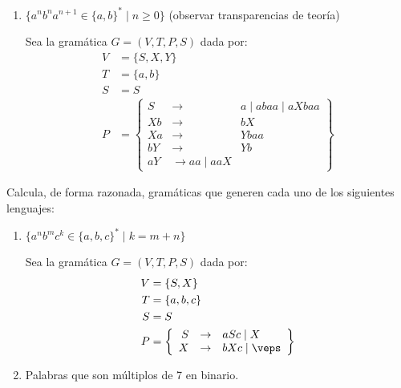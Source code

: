 \begin{ejercicio}
\begin{enumerate}
        \item $\{a^nb^na^{n+1} \in \{a,b\}^\ast \mid n\geq 0\}$ (observar transparencias de teoría)
        
        Sea la gramática $G=\left(V,T,P,S\right)$ dada por:
        \begin{align*}
            V &= \{S, X, Y\} \\
            T &= \{a,b\} \\
            S &= S \\
            P &= \left\{
                \begin{array}{rcl}
                    S &\rightarrow & a\mid abaa\mid aXbaa\\
                    Xb & \rightarrow & bX\\
                    Xa & \rightarrow & Ybaa\\
                    bY & \rightarrow & Yb\\
                    aY & \rightarrow aa\mid aaX
                \end{array}
            \right\}
        \end{align*}
    \end{enumerate}
\end{ejercicio}


\begin{ejercicio}
    Calcula, de forma razonada, gramáticas que generen cada uno de los siguientes lenguajes:
    \begin{enumerate}
        \item $\{a^nb^mc^k \in \{a,b,c\}^\ast \mid k = m + n\}$
        
        Sea la gramática $G=\left(V,T,P,S\right)$ dada por:
        \begin{align*}
            V &= \{S, X\} \\
            T &= \{a,b,c\} \\
            S &= S \\
            P &= \left\{
                \begin{array}{rcl}
                    S &\rightarrow & aSc \mid X \\
                    X &\rightarrow & bXc \mid \veps
                \end{array}
            \right\}
        \end{align*}
        
        \item Palabras que son múltiplos de 7 en binario.
        
    \end{enumerate}
\end{ejercicio}


